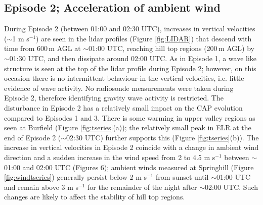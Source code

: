 \documentclass[times]{qjrms4}
\begin{document}
\subsection{Episode 2; Acceleration of ambient wind}
\label{ep2}
During Episode 2 (between 01:00 and 02:30 UTC), increases in vertical velocities ($\sim$1 m s$^{−1}$) are seen in the lidar profiles (Figure \ref{fig:LIDAR}) that descend with time from 600$\,\mbox{m}$ AGL at $\sim$01:00 UTC, reaching hill top regions (200$\,\mbox{m}$ AGL) by $\sim$01:30 UTC, and then dissipate around 02:00 UTC. As in Episode 1, a wave like structure is seen at the top of the lidar profile during Episode 2; however, on this occasion there is no intermittent behaviour in the vertical velocities, i.e. little evidence of wave activity. No radiosonde measurements were taken during Episode 2, therefore identifying gravity wave activity is restricted. The disturbance in Episode 2 has a relatively small impact on the CAP evolution compared to Episodes 1 and 3. There is some warming in upper valley regions as seen at Burfield (Figure \ref{fig:tseries}(a)); the relatively small peak in ELR at the end of Episode 2 ($\sim$02:30 UTC) further supports this (Figure \ref{fig:tseries}(b)). The increase in vertical velocities in Episode 2 coincide with a change in ambient wind direction and a sudden increase in the wind speed from 2 to 4.5 m s$^{-1}$ between $\sim$01:00 and 02:00 UTC (Figures 6); ambient winds measured at Springhill (Figure \ref{fig:windtseries}) generally persist below 2 m s$^{-1}$ from sunset until $\sim$01:00 UTC and remain above 3 m s$^{-1}$ for the remainder of the night after $\sim$02:00 UTC. Such changes are likely to affect the stability of hill top regions.
\end{document}
